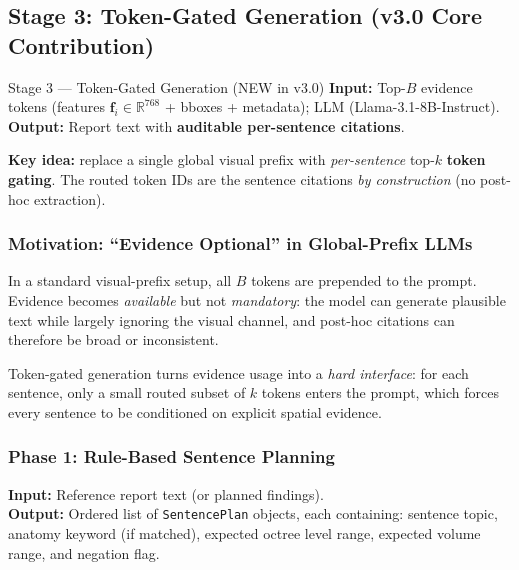 \documentclass[11pt,a4paper]{article}
\newcommand{\RR}{\mathbb{R}}
\begin{document}
\subsection{Stage 3: Token-Gated Generation (v3.0 Core Contribution)}
\label{sec:gated_gen}

\begin{newstagebox}{Stage 3 --- Token-Gated Generation (NEW in v3.0)}
\textcolor{inputcolor}{\textbf{Input:}} Top-$B$ evidence tokens (features $\mathbf{f}_i \in \RR^{768}$ + bboxes + metadata); LLM (Llama-3.1-8B-Instruct).\\
\textcolor{outputcolor}{\textbf{Output:}} Report text with \textbf{auditable per-sentence citations}.

\textbf{Key idea:} replace a single global visual prefix with \emph{per-sentence} top-$k$ \textbf{token gating}.
The routed token IDs are the sentence citations \emph{by construction} (no post-hoc extraction).
\end{newstagebox}

\subsubsection{Motivation: ``Evidence Optional'' in Global-Prefix LLMs}
In a standard visual-prefix setup, all $B$ tokens are prepended to the prompt.
Evidence becomes \emph{available} but not \emph{mandatory}: the model can generate plausible text while largely ignoring the visual channel, and post-hoc citations can therefore be broad or inconsistent.

Token-gated generation turns evidence usage into a \emph{hard interface}:
for each sentence, only a small routed subset of $k$ tokens enters the prompt, which forces every sentence to be conditioned on explicit spatial evidence.

\subsubsection{Phase 1: Rule-Based Sentence Planning}
\label{sec:planning}

\begin{iobox}
\textcolor{inputcolor}{\textbf{Input:}} Reference report text (or planned findings).\\
\textcolor{outputcolor}{\textbf{Output:}} Ordered list of \texttt{SentencePlan} objects, each containing: sentence topic, anatomy keyword (if matched), expected octree level range, expected volume range, and negation flag.
\end{iobox}
\end{document}
